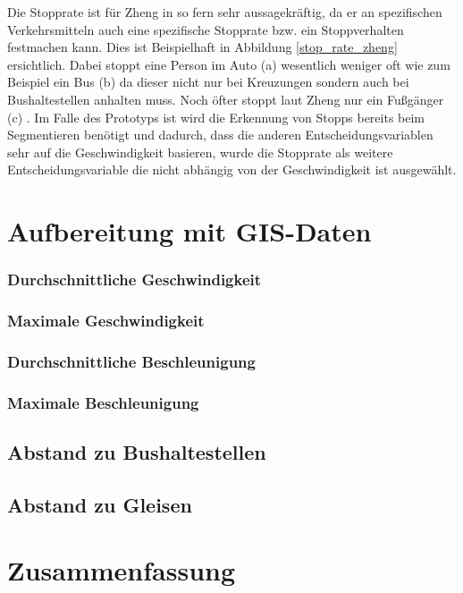 Die Stopprate ist für Zheng in so fern sehr aussagekräftig, da er an spezifischen Verkehrsmitteln auch eine spezifische Stopprate bzw. ein Stoppverhalten festmachen kann. Dies ist Beispielhaft in Abbildung \ref{stop_rate_zheng} ersichtlich. Dabei stoppt eine Person im Auto (a) wesentlich weniger oft wie zum Beispiel ein Bus (b) da dieser nicht nur bei Kreuzungen sondern auch bei Bushaltestellen anhalten muss. Noch öfter stoppt laut Zheng nur ein Fußgänger (c) \cite{zheng_understanding_2010}. Im Falle des Prototyps ist wird die Erkennung von Stopps bereits beim Segmentieren benötigt und dadurch, dass die anderen Entscheidungsvariablen sehr auf die Geschwindigkeit basieren, wurde die Stopprate als weitere Entscheidungsvariable die nicht abhängig von der Geschwindigkeit ist ausgewählt. 




\clearpage

\section{Aufbereitung mit GIS-Daten}
\subsubsection{Durchschnittliche Geschwindigkeit}
\subsubsection{Maximale Geschwindigkeit}
\subsubsection{Durchschnittliche Beschleunigung}
\subsubsection{Maximale Beschleunigung}
\subsection{Abstand zu Bushaltestellen}
\subsection{Abstand zu Gleisen}

\clearpage

\section{Zusammenfassung}
